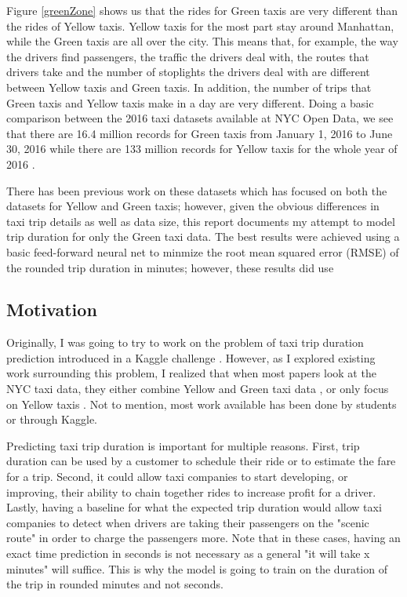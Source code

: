 \documentclass[conference]{IEEEtran}
\begin{document}
Figure \ref{greenZone} shows us that the rides for Green taxis are very different than the rides of Yellow taxis.  Yellow taxis for the most part stay around Manhattan, while the Green taxis are all over the city.  This means that, for example, the way the drivers find passengers, the traffic the drivers deal with, the routes that drivers take and the number of stoplights the drivers deal with are different between Yellow taxis and Green taxis.  In addition, the number of trips that Green taxis and Yellow taxis make in a day are very different.  Doing a basic comparison between the 2016 taxi datasets available at NYC Open Data, we see that there are 16.4 million records for Green taxis from January 1, 2016 to June 30, 2016 \cite{green2016} while there are 133 million records for Yellow taxis for the whole year of 2016 \cite{yellow2016}.  

There has been previous work on these datasets which has focused on both the datasets for Yellow and Green taxis; however, given the obvious differences in taxi trip details as well as data size, this report documents my attempt to model trip duration for only the Green taxi data.  The best results were achieved using a basic feed-forward neural net to minmize the root mean squared error (RMSE) of the rounded trip duration in minutes; however, these results did use


\subsection{Motivation}
Originally, I was going to try to work on the problem of taxi trip duration prediction introduced in a Kaggle challenge \cite{kaggle}.  However, as I explored existing work surrounding this problem, I realized that when most papers look at the NYC taxi data, they either combine Yellow and Green taxi data \cite{blog}, or only focus on Yellow taxis \cite{kaggle}\cite{ucsd}.  Not to mention, most work available has been done by students or through Kaggle.

Predicting taxi trip duration is important for multiple reasons.  First, trip duration can be used by a customer to schedule their ride or to estimate the fare for a trip.  Second, it could allow taxi companies to start developing, or improving, their ability to chain together rides to increase profit for a driver.  Lastly, having a baseline for what the expected trip duration would allow taxi companies to detect when drivers are taking their passengers on the "scenic route" in order to charge the passengers more.  Note that in these cases, having an exact time prediction in seconds is not necessary as a general "it will take x minutes" will suffice.  This is why the model is going to train on the duration of the trip in rounded minutes and not seconds.
\end{document}

